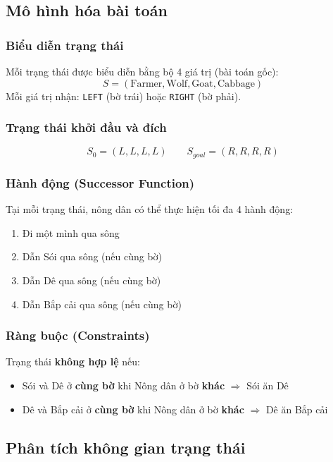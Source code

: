 \documentclass[a4paper,12pt]{article}
\begin{document}
\subsection{Mô hình hóa bài toán}

\subsubsection{Biểu diễn trạng thái}

Mỗi trạng thái được biểu diễn bằng bộ 4 giá trị (bài toán gốc):
\[
    S = (\text{Farmer}, \text{Wolf}, \text{Goat}, \text{Cabbage})
\]
Mỗi giá trị nhận: \texttt{LEFT} (bờ trái) hoặc \texttt{RIGHT} (bờ phải).

\subsubsection{Trạng thái khởi đầu và đích}
\[
    S_0 = (L, L, L, L) \qquad S_{goal} = (R, R, R, R)
\]

\subsubsection{Hành động (Successor Function)}

Tại mỗi trạng thái, nông dân có thể thực hiện tối đa 4 hành động:
\begin{enumerate}
    \item Đi một mình qua sông
    \item Dẫn Sói qua sông (nếu cùng bờ)
    \item Dẫn Dê qua sông (nếu cùng bờ)
    \item Dẫn Bắp cải qua sông (nếu cùng bờ)
\end{enumerate}

\subsubsection{Ràng buộc (Constraints)}

Trạng thái \textbf{không hợp lệ} nếu:
\begin{itemize}
    \item Sói và Dê ở \textbf{cùng bờ} khi Nông dân ở bờ \textbf{khác} $\Rightarrow$ Sói ăn Dê
    \item Dê và Bắp cải ở \textbf{cùng bờ} khi Nông dân ở bờ \textbf{khác} $\Rightarrow$ Dê ăn Bắp cải
\end{itemize}

\subsection{Phân tích không gian trạng thái}
\end{document}
